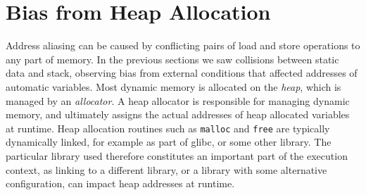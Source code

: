 \documentclass[a4paper,10pt,twocolumn,twoside]{article}
\begin{document}
{\section{Bias from Heap Allocation}

Address aliasing can be caused by conflicting pairs of load and store operations to any part of memory.
In the previous sections we saw collisions between static data and stack, observing bias from external conditions that affected addresses of automatic variables.
Most dynamic memory is allocated on the \emph{heap}, which is managed by an \emph{allocator}.
A heap allocator is responsible for managing dynamic memory, and ultimately assigns the actual addresses of heap allocated variables at runtime.
Heap allocation routines such as \texttt{malloc} and \texttt{free} are typically dynamically linked, for example as part of glibc, or some other library.
The particular library used therefore constitutes an important part of the execution context, as linking to a different library, or a library with some alternative configuration, can impact heap addresses at runtime.


}
\end{document}
